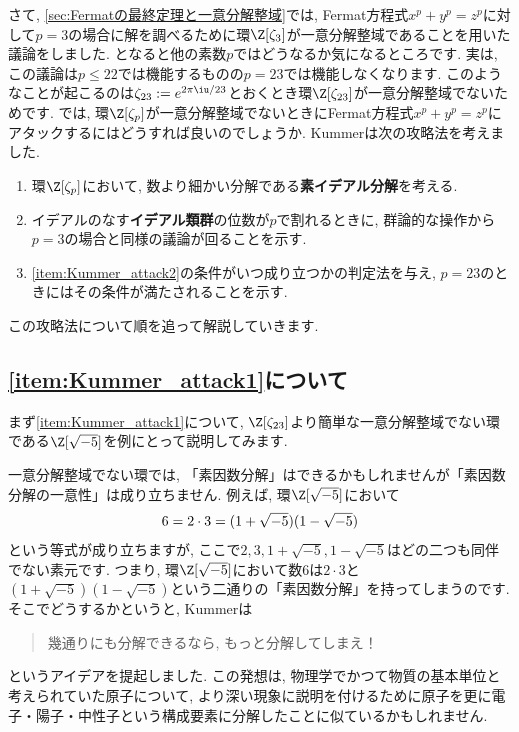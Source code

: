 \documentclass[11pt,b5paper,oneside,titlepage,lualatex]{ltjsreport}
\numberwithin{equation}{section} %
\begin{document}
さて, \cref{sec:Fermatの最終定理と一意分解整域}では, Fermat方程式$ x^p + y^p = z^p $に対して$ p=3 $の場合に解を調べるために環$ \Z[\zeta_3] $が一意分解整域であることを用いた議論をしました. 
となると他の素数$ p $ではどうなるか気になるところです. 
実は, この議論は$ p \le 22 $では機能するものの$ p = 23 $では機能しなくなります. 
このようなことが起こるのは$ \zeta_{23} := e^{2\pi\iu/23} $とおくとき環$ \Z[\zeta_{23}] $が一意分解整域でないためです. 
では, 環$ \Z[\zeta_p] $が一意分解整域でないときにFermat方程式$ x^p + y^p = z^p $にアタックするにはどうすれば良いのでしょうか. 
Kummerは次の攻略法を考えました. 
\begin{enumerate}
	\item \label{item:Kummer_attack1} 環$ \Z[\zeta_p] $において, 数より細かい分解である\textbf{素イデアル分解}を考える. 
	\item \label{item:Kummer_attack2} イデアルのなす\textbf{イデアル類群}の位数が$ p $で割れるときに, 群論的な操作から$ p=3 $の場合と同様の議論が回ることを示す. 
	\item \label{item:Kummer_attack3} \ref{item:Kummer_attack2}の条件がいつ成り立つかの判定法を与え, $ p=23 $のときにはその条件が満たされることを示す. 
\end{enumerate}
この攻略法について順を追って解説していきます. 


\subsection{\ref{item:Kummer_attack1}について}


まず\ref{item:Kummer_attack1}について, $ \Z[\zeta_{23}] $より簡単な一意分解整域でない環である$ \Z[\sqrt{-5}] $を例にとって説明してみます. 

一意分解整域でない環では, 「素因数分解」はできるかもしれませんが「素因数分解の一意性」は成り立ちません. 
例えば, 環$ \Z[\sqrt{-5}] $において
\begin{equation} \label{decomp_sqrt{-5}}
	6 = 2 \cdot 3 = (1 + \sqrt{-5}) (1 - \sqrt{-5})
\end{equation}
という等式が成り立ちますが, ここで$ 2, 3, 1 + \sqrt{-5}, 1 - \sqrt{-5} $はどの二つも同伴でない素元です. 
つまり, 環$ \Z[\sqrt{-5}] $において数$ 6 $は$ 2 \cdot 3 $と$ (1 + \sqrt{-5}) (1 - \sqrt{-5}) $という二通りの「素因数分解」を持ってしまうのです. 
そこでどうするかというと, Kummerは
\begin{quote}
	\centering
	幾通りにも分解できるなら, もっと分解してしまえ！
\end{quote}
というアイデアを提起しました. 
この発想は, 物理学でかつて物質の基本単位と考えられていた原子について, より深い現象に説明を付けるために原子を更に電子・陽子・中性子という構成要素に分解したことに似ているかもしれません. 
\end{document}
